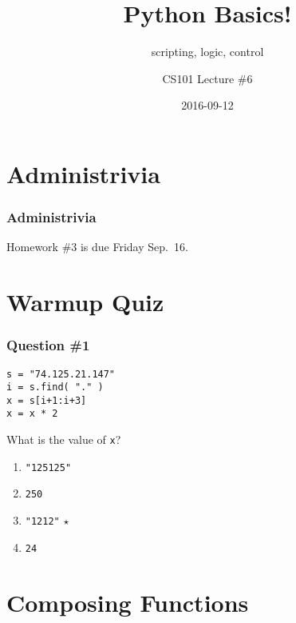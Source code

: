 \documentclass[11pt]{beamer}
\title{Python Basics!}
\subtitle{scripting, logic, control}
\author{CS101 Lecture \#6}
\date{2016-09-12}
\begin{document}
  \setcounter{showProgressBar}{0}
  \setcounter{showSlideNumbers}{0}

\frame{\titlepage}

\setcounter{framenumber}{0}
\setcounter{showProgressBar}{1}
\setcounter{showSlideNumbers}{1}

\section{Administrivia}

\begin{frame}
  \frametitle{Administrivia}
  \Enlarge
  \begin{itemize}
  \myitem  Homework \#3 is due Friday Sep.\ 16.
  \end{itemize}
\end{frame}

\section{Warmup Quiz}

\begin{frame}[fragile]
  \frametitle{Question \#1}
  \Enlarge

  \begin{Verbatim}[commandchars=\\\{\},commentchar=\%]
s = "74.125.21.147"
i = s.find( "." )
x = s[i+1:i+3]
x = x * 2
  \end{Verbatim}
  What is the value of \texttt{x}?
  \begin{enumerate}[label=\Alph*]
  \item  \texttt{"125125"}
  \item  \texttt{250}
  \item  \texttt{"1212"}  $\star$
  \item  \texttt{24}
  \end{enumerate}
\end{frame}

\section{Composing Functions}
\end{document}
